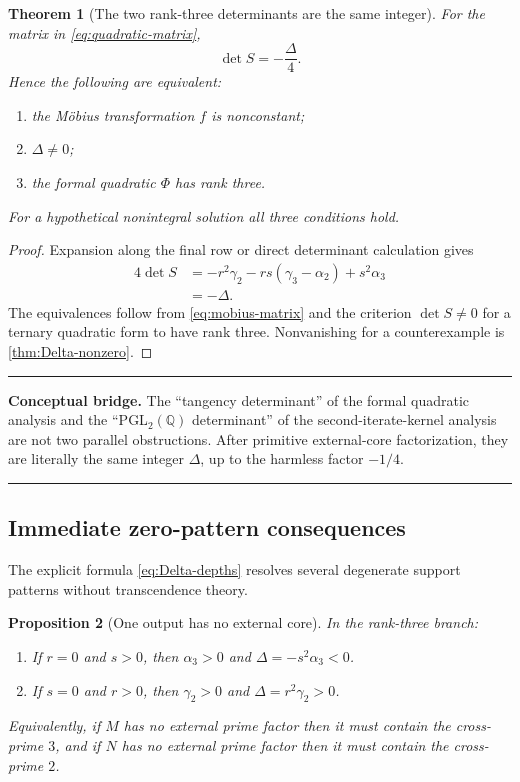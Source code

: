 \documentclass[11pt,oneside]{article}
\theoremstyle{research}
\newtheorem{theorem}{Theorem}[section]
\newtheorem{proposition}[theorem]{Proposition}
\theoremstyle{definition}
\newcommand{\Q}{\mathbb Q}
\newenvironment{resultbox}
  {\begin{center}\begin{minipage}{0.94\textwidth}\setlength{\parindent}{0pt}%
   \hrule\vspace{0.45em}}
  {\vspace{0.45em}\hrule\end{minipage}\end{center}}
\begin{document}
\begin{theorem}[The two rank-three determinants are the same integer]
\label{thm:determinant-bridge}
For the matrix in \eqref{eq:quadratic-matrix},
\begin{equation}
 \boxed{\det S=-\frac{\Delta}{4}.}
 \label{eq:detS}
\end{equation}
Hence the following are equivalent:
\begin{enumerate}[label=(\roman*),leftmargin=2em]
\item the M\"obius transformation $f$ is nonconstant;
\item $\Delta\ne0$;
\item the formal quadratic $\Phi$ has rank three.
\end{enumerate}
For a hypothetical nonintegral solution all three conditions hold.
\end{theorem}

\begin{proof}
Expansion along the final row or direct determinant calculation gives
\begin{align*}
 4\det S
 &=-r^2\gamma_2-rs(\gamma_3-\alpha_2)+s^2\alpha_3\\
 &=-\Delta.
\end{align*}
The equivalences follow from \eqref{eq:mobius-matrix} and the criterion
$\det S\ne0$ for a ternary quadratic form to have rank three.  Nonvanishing
for a counterexample is \cref{thm:Delta-nonzero}.
\end{proof}

\begin{resultbox}
\textbf{Conceptual bridge.}
The ``tangency determinant'' of the formal quadratic analysis and the
``PGL$_2(\Q)$ determinant'' of the second-iterate-kernel analysis are not two
parallel obstructions.  After primitive external-core factorization, they are
literally the same integer $\Delta$, up to the harmless factor $-1/4$.
\end{resultbox}

\subsection{Immediate zero-pattern consequences}

The explicit formula \eqref{eq:Delta-depths} resolves several degenerate
support patterns without transcendence theory.

\begin{proposition}[One output has no external core]
\label{prop:one-external-zero}
In the rank-three branch:
\begin{enumerate}[label=(\alph*),leftmargin=2em]
\item If $r=0$ and $s>0$, then $\alpha_3>0$ and
      $\Delta=-s^2\alpha_3<0$.
\item If $s=0$ and $r>0$, then $\gamma_2>0$ and
      $\Delta=r^2\gamma_2>0$.
\end{enumerate}
Equivalently, if $M$ has no external prime factor then it must contain the
cross-prime $3$, and if $N$ has no external prime factor then it must contain
the cross-prime $2$.
\end{proposition}
\end{document}
